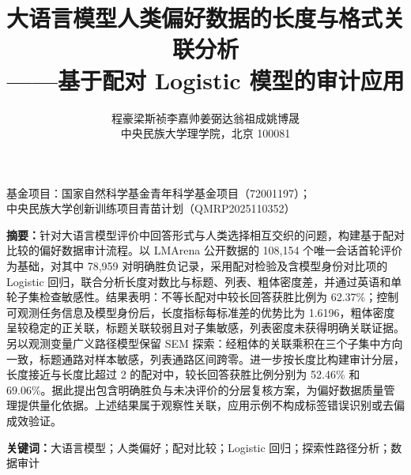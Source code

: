 \documentclass[UTF8,11pt,a4paper,fontset=windows]{ctexart}
\title{\heiti 大语言模型人类偏好数据的长度与格式关联分析\\[0.3em]
\large ——基于配对 Logistic 模型的审计应用}
\author{程豪\quad 梁斯祯\quad 李嘉帅\quad 姜弼达\quad 翁祖成\quad 姚博晟\\
\small 中央民族大学理学院，北京 100081}
\date{}
\numberwithin{equation}{section}
\begin{document}
\maketitle
\thispagestyle{plain}
\begin{center}\small
基金项目：国家自然科学基金青年科学基金项目（72001197）；\\
中央民族大学创新训练项目青苗计划（QMRP2025110352）
\end{center}

\noindent\textbf{摘要：}针对大语言模型评价中回答形式与人类选择相互交织的问题，构建基于配对比较的偏好数据审计流程。以 LMArena 公开数据的 108,154 个唯一会话首轮评价为基础，对其中 78,959 对明确胜负记录，采用配对检验及含模型身份对比项的 Logistic 回归，联合分析长度对数比与标题、列表、粗体密度差，并通过英语和单轮子集检查敏感性。结果表明：不等长配对中较长回答获胜比例为 62.37\%；控制可观测任务信息及模型身份后，长度指标每标准差的优势比为 1.6196，粗体密度呈较稳定的正关联，标题关联较弱且对子集敏感，列表密度未获得明确关联证据。另以观测变量广义路径模型保留 SEM 探索：经粗体的关联乘积在三个子集中方向一致，标题通路对样本敏感，列表通路区间跨零。进一步按长度比构建审计分层，长度接近与长度比超过 2 的配对中，较长回答获胜比例分别为 52.46\% 和 69.06\%。据此提出包含明确胜负与未决评价的分层复核方案，为偏好数据质量管理提供量化依据。上述结果属于观察性关联，应用示例不构成标签错误识别或去偏成效验证。

\noindent\textbf{关键词：}大语言模型；人类偏好；配对比较；Logistic 回归；探索性路径分析；数据审计
\end{document}
